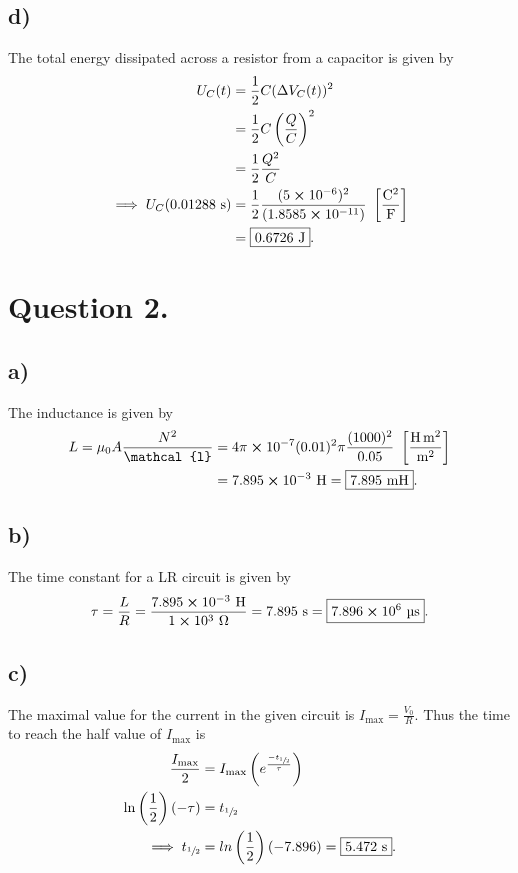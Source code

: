 \documentclass[
	12pt,
	]{article}
\theoremstyle{definition}
\theoremstyle{definition}
\theoremstyle{definition}
\theoremstyle{definition}
\theoremstyle{definition}
\theoremstyle{example}
\theoremstyle{note}
\theoremstyle{remark}
\theoremstyle{example}
\begin{document}
		\subsection*{d) }
			The total energy dissipated across a resistor from a capacitor is given by 
			\begin{align*}
				U_{C}(t) &= \frac12 C (\Delta V_{C}(t))^{2} \\&= \frac12 C \left(\frac{Q}{C}\right)^{2} \\
				&= \frac12 \frac{Q^{2}}{C}\\
				\implies U_{C}(0.01288 \ \si{\second}) &= \frac12 \frac{(5 \cross 10^{-6})^{2}}{(1.8585 \cross 10^{-11})} \ \left[\frac{\si{\coulomb\squared}}{\si{\farad}}\right] \\
				&= \boxed{0.6726 \ \si{\joule}}.
			\end{align*}
	\section*{Question 2.}
		\subsection*{a) }
			The inductance is given by 
			\begin{align*}
				L = \mu_{0} A \frac{N^{2}}{\mathcal{l}} &=4\pi \cross 10^{-7} (0.01)^{2}\pi\frac{(1000)^{2}}{0.05} \ \left[\frac{\si{\henry\meter\squared}}{\si{\meter\squared}}\right] \\
				&=7.895 \cross 10^{-3} \ \si{\henry} = \boxed{7.895 \ \si{\milli\henry}}.
			\end{align*}
		\subsection*{b) }
			The time constant for a LR circuit is given by 
			\begin{align*}
				\tau = \frac{L}{R} =\frac{7.895\cross 10^{-3} \ \si{\henry}}{1\cross 10^{3} \ \si{\ohm}} = 7.895 \ \si{\second} = \boxed{7.896 \cross 10^{6} \ \si{\micro\second}}.
			\end{align*}
		\subsection*{c) }
			The maximal value for the current in the given circuit is $I_{\text{max}} = \frac{V_{0}}{R}$. Thus the time to reach the half value of $I_{\text{max}}$ is 
			\begin{align*}
				\frac{I_{\text{max}}}{2} &= I_{\text{max}} \left(e^{\frac{-t_{\sfrac{1}{2}}}{\tau}}\right) \\
				\ln\left(\frac12\right)(-\tau) &= t_{\sfrac{1}{2}} \\
				\implies t_{\sfrac{1}{2}} &= ln\left(\frac12\right)(-7.896) = \boxed{5.472 \ \si{\second}}.
			\end{align*}
\end{document}
